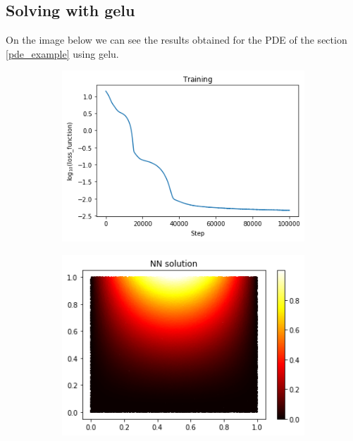 \subsection{Solving with gelu}
On the image below we can see the results obtained for the PDE of the section \ref{pde_example} using gelu.
\vspace{-0.45cm}
\begin{figure}[H]
\begin{subfigure}{.45\textwidth}
    \centering
    \includegraphics[width=.8\linewidth]{images/NN_Jax_PDE8_files_gelu/NN_Jax_PDE8_18_1.png}
    \label{fig:sub1}
\end{subfigure}%
\begin{subfigure}{0.45\textwidth}
    \centering
    \includegraphics[width=0.8\linewidth]{images/NN_Jax_PDE8_files_gelu/NN_Jax_PDE8_20_0.png}
    \label{fig:sub2}
\end{subfigure}
\newline
\begin{subfigure}{.45\textwidth}
    \centering

\end{subfigure}
\end{figure}
